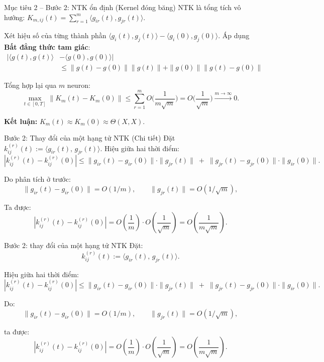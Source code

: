 \begin{frame}{Mục tiêu 2 – Bước 2: NTK ổn định (Kernel đóng băng)}
  NTK là tổng tích vô hướng: $K_{m,ij}(t) = \sum_{r=1}^m \langle g_{ir}(t), g_{jr}(t) \rangle$.

  Xét hiệu số của từng thành phần $\langle g_i(t), g_j(t) \rangle - \langle g_i(0), g_j(0) \rangle$.
  Áp dụng \textbf{Bất đẳng thức tam giác}:
  \[
    \begin{aligned}
      |\langle g(t), g(t) \rangle &- \langle g(0), g(0) \rangle| \\
      &\le \|g(t)-g(0)\|\|g(t)\| + \|g(0)\|\|g(t)-g(0)\|
    \end{aligned}
  \]
  
  Tổng hợp lại qua $m$ neuron:
  \[
    \max_{t \in [0,T]} \|K_m(t) - K_m(0)\| \le \sum_{r=1}^m O\Big(\frac{1}{m\sqrt{m}}\Big) = O\Big(\frac{1}{\sqrt{m}}\Big) \xrightarrow{m \to \infty} 0.
  \]

  \textbf{Kết luận:} $K_m(t) \approx K_m(0) \approx \Theta(X,X)$.
\end{frame}

\begin{frame}{Bước 2: Thay đổi của một hạng tử NTK (Chi tiết)}
Đặt $k_{ij}^{(r)}(t) := \langle g_{ir}(t),\, g_{jr}(t)\rangle$. Hiệu giữa hai thời điểm:
\[
  |k_{ij}^{(r)}(t) - k_{ij}^{(r)}(0)|
  \le
  \|g_{ir}(t)-g_{ir}(0)\|\cdot \|g_{jr}(t)\|
  \;+\;
  \|g_{jr}(t)-g_{jr}(0)\|\cdot \|g_{ir}(0)\|.
\]

Do phân tích ở trước:
\[
  \|g_{ir}(t)-g_{ir}(0)\| = O(1/m), \qquad
  \|g_{jr}(t)\| = O(1/\sqrt{m}),
\]

Ta được:
\[
  |k_{ij}^{(r)}(t) - k_{ij}^{(r)}(0)|
  = O\!\left(\frac{1}{m}\right)
    \cdot O\!\left(\frac{1}{\sqrt{m}}\right)
  = O\!\left(\frac{1}{m\sqrt{m}}\right).
\]
\end{frame}

\begin{frame}{Bước 2: thay đổi của một hạng tử NTK}
Đặt:
\[
  k_{ij}^{(r)}(t) := \langle g_{ir}(t),\, g_{jr}(t)\rangle.
\]

Hiệu giữa hai thời điểm:
\[
  |k_{ij}^{(r)}(t) - k_{ij}^{(r)}(0)|
  \le
  \|g_{ir}(t)-g_{ir}(0)\|\cdot \|g_{jr}(t)\|
  \;+\;
  \|g_{jr}(t)-g_{jr}(0)\|\cdot \|g_{ir}(0)\|.
\]

Do:
\[
  \|g_{ir}(t)-g_{ir}(0)\| = O(1/m), \qquad
  \|g_{jr}(t)\| = O(1/\sqrt{m}),
\]

ta được:
\[
  |k_{ij}^{(r)}(t) - k_{ij}^{(r)}(0)|
  = O\!\left(\frac{1}{m}\right)
    \cdot O\!\left(\frac{1}{\sqrt{m}}\right)
  = O\!\left(\frac{1}{m\sqrt{m}}\right).
\]
\end{frame}

